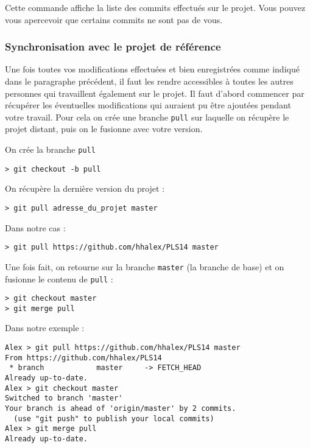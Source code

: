 \par Cette commande affiche la liste des commits effectués sur le projet. Vous pouvez vous apercevoir que certains commits ne sont pas de vous.

\subsubsection{Synchronisation avec le projet de référence}
\label{sec:synchr-avec-le}

\par Une fois toutes vos modifications effectuées et bien enregistrées comme indiqué dans le paragraphe précédent, il faut les rendre accessibles à toutes les autres personnes qui travaillent également sur le projet. Il faut d'abord commencer par récupérer les éventuelles modifications qui auraient pu être ajoutées pendant votre travail. Pour cela on crée une branche \texttt{pull} sur laquelle on récupère le projet distant, puis on le fusionne avec votre version.

\par On crée la branche \texttt{pull}
\begin{verbatim}
> git checkout -b pull
\end{verbatim}

\par On récupère la dernière version du projet :
\begin{verbatim}
> git pull adresse_du_projet master
\end{verbatim}

\par Dans notre cas :
\begin{verbatim}
> git pull https://github.com/hhalex/PLS14 master
\end{verbatim}

\par Une fois fait, on retourne sur la branche \texttt{master} (la branche de base) et on fusionne le contenu de \texttt{pull} :

\begin{verbatim}
> git checkout master
> git merge pull
\end{verbatim}

\par Dans notre exemple :

\begin{verbatim}
Alex > git pull https://github.com/hhalex/PLS14 master
From https://github.com/hhalex/PLS14
 * branch            master     -> FETCH_HEAD
Already up-to-date.
Alex > git checkout master
Switched to branch 'master'
Your branch is ahead of 'origin/master' by 2 commits.
  (use "git push" to publish your local commits)
Alex > git merge pull
Already up-to-date.
\end{verbatim}

